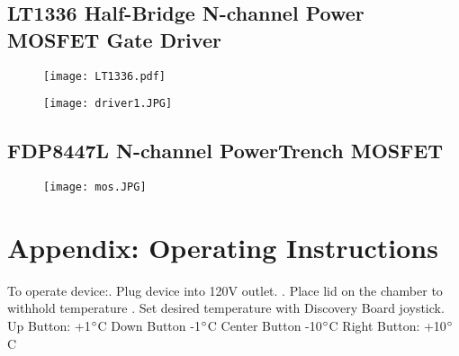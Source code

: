 \documentclass[11pt,letter]{article}
\begin{document}
\subsection{LT1336 Half-Bridge N-channel Power MOSFET Gate Driver}

\begin{figure}[H]
    \centering
    \texttt{[image: LT1336.pdf]}
\end{figure}

\begin{figure}[H]
    \centering
    \texttt{[image: driver1.JPG]}
\end{figure}

\newpage

%

\subsection{FDP8447L N-channel PowerTrench MOSFET}

\begin{figure}[H]
    \centering
    \texttt{[image: mos.JPG]}
\end{figure}


%

\section{Appendix: Operating Instructions}

To operate device:. Plug device into 120V outlet. . Place lid on the chamber to withhold temperature . Set desired temperature with Discovery Board joystick. \newline
Up Button: +1$\degree$C \newline
Down Button    -1$\degree$C\newline
Center Button  -10$\degree$C\newline
Right Button:	  +10$\degree$C
\end{document}
